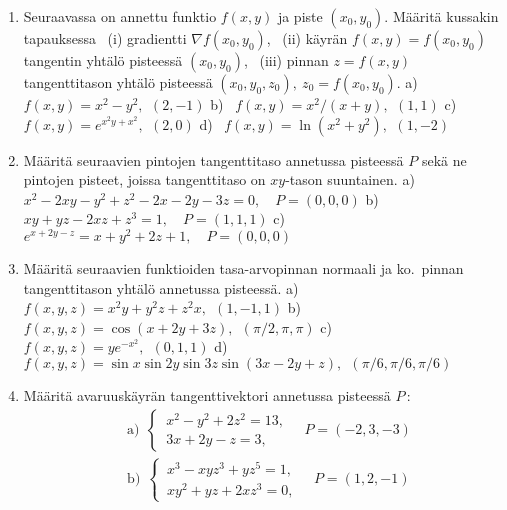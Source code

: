 \begin{enumerate}
\item
Seuraavassa on annettu funktio $f(x,y)$ ja piste $(x_0,y_0)$. Määritä kussakin tapauksessa \,
(i) gradientti $\nabla f(x_0,y_0)$, \, (ii) käyrän $f(x,y)=f(x_0,y_0)$ tangentin yhtälö
pisteessä $(x_0,y_0)$, \, (iii) pinnan $z=f(x,y)$ tangenttitason yhtälö pisteessä
$(x_0,y_0,z_0),\ z_0=f(x_0,y_0)$. \vspace{2mm}\newline
a) \ $ f(x,y)=x^2-y^2,\,\ (2,-1)$ \quad
b) \ $f(x,y)=x^2/(x+y),\,\ (1,1)$ \vspace{1mm}\newline
c) \ $f(x,y)=e^{x^2y+x^2},\,\ (2,0)$ \qquad
d) \ $f(x,y)=\ln(x^2+y^2),\,\ (1,-2)$

\item 
Määritä seuraavien pintojen tangenttitaso annetussa pisteessä $P$ sekä ne pintojen pisteet,
joissa tangenttitaso on $xy$-tason suuntainen. \vspace{2mm}\newline
a) \ $x^2-2xy-y^2+z^2-2x-2y-3z= 0, \quad P=(0,0,0)$ \vspace{1mm}\newline
b) \ $xy+yz-2xz+z^3=1, \quad P=(1,1,1)$ \vspace{1mm}\newline
c) \ $e^{x+2y-z}=x+y^2+2z+1, \quad P=(0,0,0)$

\item
Määritä seuraavien funktioiden tasa-arvopinnan normaali ja ko.\ pinnan tangenttitason yhtälö
annetussa pisteessä. \vspace{2mm}\newline
a) \ $f(x,y,z)=x^2y+y^2z+z^2x,\ \ (1,-1,1)$ \vspace{1mm}\newline
b) \ $f(x,y,z)=\cos(x+2y+3z),\ \ (\pi/2,\pi,\pi)$ \vspace{1mm}\newline
c) \ $f(x,y,z)=ye^{-x^2},\ \ (0,1,1)$ \vspace{1mm}\newline
d) \ $f(x,y,z)=\sin x\sin 2y\sin 3z\sin(3x-2y+z),\ \ (\pi/6,\pi/6,\pi/6)$

\item
Määritä avaruuskäyrän tangenttivektori annetussa pisteessä $P\,$:
\begin{align*}
&\text{a)}\ \ \begin{cases} 
              \,x^2-y^2+2z^2=13, \\ \,3x+2y-z=3,
              \end{cases} \quad P=(-2,3,-3) \\
&\text{b)}\ \ \begin{cases} 
              \,x^3-xyz^3+yz^5=1, \\ \,xy^2+yz+2xz^3=0,
              \end{cases} \quad P=(1,2,-1)
\end{align*}


\end{enumerate}
